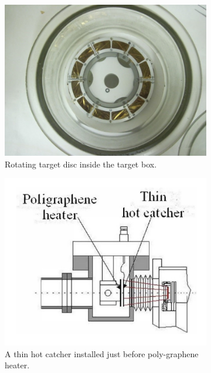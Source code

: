 \documentclass[12pt]{article}
\begin{document}
\begin{figure}[h]
\centering
\begin{subfigure}[h]{0.49\textwidth}
\centering
\includegraphics[scale=0.535]{Rotating Target.jpg}
\caption{Rotating target disc inside the target box.}
\label{Rotating target disc inside the target box.}
\end{subfigure}
\hfill
\begin{subfigure}[h]{0.49\textwidth}
\centering
\includegraphics[scale=0.535]{HC.png}
\caption{A thin hot catcher installed just before poly-graphene heater.}
\label{A thin hot catcher installed just before poly-graphene heater.}
\end{subfigure}
\caption{}
\end{figure}
\end{document}
